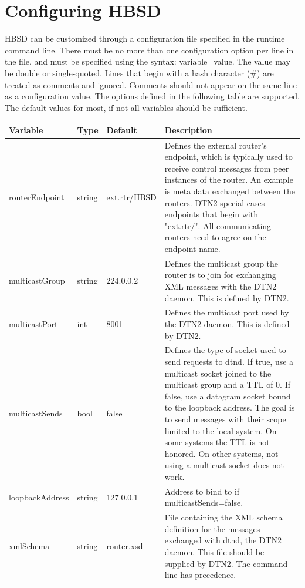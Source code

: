 \section{Configuring HBSD}
HBSD can be customized through a configuration file specified in the runtime command line.  
There must be no more than one configuration option per line in the file, and must be specified using the syntax: variable=value. The value may be double or single-quoted. Lines that begin with a hash character ($\#$) are treated as comments and ignored. Comments should not appear on the same line as a configuration value. The options defined in the following table are supported. The default values for most, if not all variables should be sufficient.

\begin{longtable}[!h]{|p{4cm}|p{1cm}|p{2.2cm}|p{5cm}|}
\hline
\textbf{Variable}& \textbf{Type} & \textbf{Default} & \textbf{Description} \\
\hline
routerEndpoint &  string & ext.rtr/HBSD & Defines the external router's endpoint, which is typically  used to receive control 
messages from peer  instances of the router. An 
example is meta data exchanged between the 
routers. DTN2 special-cases endpoints that begin with 
"ext.rtr/". All communicating routers need to agree on the  endpoint name.\\
\hline
multicastGroup & string &  224.0.0.2 & Defines the multicast group the router is to join for  exchanging XML messages 
with the DTN2 daemon. This is defined by DTN2.\\
\hline
multicastPort & int & 8001 & Defines the multicast port  used by the DTN2 daemon. This is defined by DTN2.\\
\hline
multicastSends & bool & false & Defines the type of socket used to send requests to
dtnd. If true, use a multicast socket joined to the multicast group and a TTL of 0. If false, use a datagram socket bound to the 
loopback address. The goal is to send messages with their scope limited to the 
local system. On some systems the TTL is not honored. On other systems, not using a multicast socket does not work. \\
\hline
loopbackAddress & string & 127.0.0.1 & Address to bind to if multicastSends=false.\\
\hline
xmlSchema & string  & router.xsd& File containing the XML schema definition for the 
messages exchanged with dtnd, the DTN2 daemon. This file should be supplied by DTN2. The command line has precedence.\\

\end{longtable}
